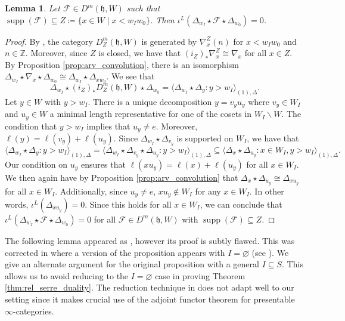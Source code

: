 \documentclass{amsart}
\newcommand{\Z}{\mathbb{Z}}
\newcommand{\scrF}{\mathcal{F}}
\newcommand{\BE}{D^m}
\newcommand{\fr}[1]{\mathfrak{#1}}
\renewcommand{\emptyset}{\varnothing}
\DeclareMathOperator{\supp}{supp}
\newtheorem{lemma}{Lemma}[section]
\theoremstyle{definition}
\begin{document}
        \begin{lemma}\label{lem:support_tech_lemma}
                Let $\scrF \in \BE (\fr{h}, W)$ such that $\supp (\scrF) \subseteq Z \coloneq \{x \in W \mid x < w_I w_0\}$. 
                Then $\iota^L (\Delta_{w_I} \star \scrF \star \Delta_{w_0} ) = 0$. 
        \end{lemma}
        \begin{proof}
                By \cite[Lemma 6.9]{ARV}, the category $\BE_Z (\fr{h}, W)$ is generated by $\nabla_x^Z (n)$ for $x < w_I w_0$ and $n \in \Z$.
                Moreover, since $Z$ is closed, we have that $(i_Z)_* \nabla_x^Z \cong \nabla_x$ for all $x \in Z$.
                By Proposition \ref{prop:arv_convolution}, there is an isomorphism $\Delta_{w_I} \star  \nabla_x \star \Delta_{w_0} \cong \Delta_{w_I} \star \Delta_{x w_0}$.
                We see that 
                \[\Delta_{w_I} \star (i_Z)_* \BE_Z (\fr{h}, W) \star \Delta_{w_0} = \langle \Delta_{w_I} \star \Delta_{y} : y > w_I \rangle_{(1), \Delta}.\]
                Let $y \in W$ with $y > w_I$. There is a unique decomposition $y = v_y u_y$ where $v_y \in W_I$ and $u_y \in W$ a minimal length representative for one of the cosets in $W_I \backslash W$.
                The condition that $y > w_I$ implies that $u_y \neq e$. Moreover, $\ell (y) = \ell (v_y) + \ell (u_y)$.
                Since $\Delta_{w_I} \star \Delta_{v_y}$ is supported on $W_I$, we have that
                \[\langle \Delta_{w_I} \star \Delta_{y} : y > w_I \rangle_{(1), \Delta} = \langle \Delta_{w_I} \star \Delta_{v_y} \star \Delta_{u_y} : y > w_I \rangle_{(1), \Delta} \subseteq \langle \Delta_x \star \Delta_{u_y} : x \in W_I, y > w_I\rangle_{(1), \Delta}.\]
                Our condition on $u_y$ ensures that $\ell (xu_y) = \ell (x) + \ell (u_y)$ for all $x \in W_I$. 
                We then again have by Proposition \ref{prop:arv_convolution} that $\Delta_x \star \Delta_{u_y} \cong \Delta_{xu_y}$ for all $x \in W_I$.
                Additionally, since $u_y \neq e$, $xu_y \notin W_I$ for any $x \in W_I$. In other words, $\iota^L (\Delta_{xu_y}) = 0$.
                Since this holds for all $x \in W_I$, we can conclude that $\iota^L (\Delta_{w_I} \star \scrF \star \Delta_{w_0} ) = 0$ for all $\scrF \in \BE (\fr{h}, W)$ with $\supp (\scrF) \subseteq Z$. 
        \end{proof}

        The following lemma appeared as \cite[Proposition 3.1.2]{HLold}, however its proof is subtly flawed. 
        This was corrected in \cite{HLnew} where a version of the proposition appears with $I = \emptyset$ (see \cite[Proposition 3.1.2]{HLnew}).
        We give an alternate argument for the original proposition with a general $I \subseteq S$. 
        This allows us to avoid reducing to the $I = \emptyset$ case in proving Theorem \ref{thm:rel_serre_duality}.
        The reduction technique in \cite{HLnew} does not adapt well to our setting since it makes crucial use of the adjoint functor theorem for presentable $\infty$-categories.
\end{document}
